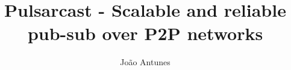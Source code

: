 \documentclass[sigplan, screen, nonacm]{acmart}
\begin{document}
\title[Pulsarcast]{Pulsarcast - Scalable and reliable pub-sub over P2P networks}


\renewcommand{\shorttitle}{Pulsarcast}


\author{João Antunes}


\maketitle











\appendix

\end{document}
